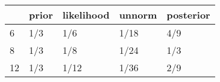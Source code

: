 \begin{tabular}{lllll}
\toprule
{} & prior & likelihood & unnorm & posterior \\
\midrule
6  &   1/3 &        1/6 &   1/18 &       4/9 \\
8  &   1/3 &        1/8 &   1/24 &       1/3 \\
12 &   1/3 &       1/12 &   1/36 &       2/9 \\
\bottomrule
\end{tabular}
